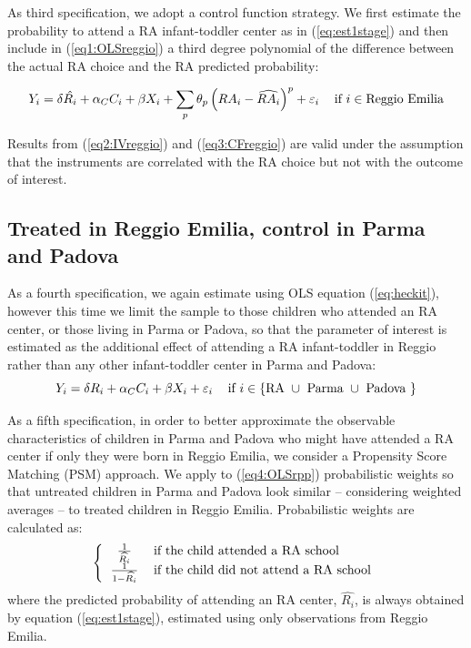 \documentclass[12pt]{article}
\begin{document}
\medskip

As third specification, we adopt a control function strategy. We first estimate the probability to attend a RA infant-toddler center as in (\ref{eq:est1stage}) and then include in (\ref{eq1:OLSreggio}) a third degree polynomial of the difference between the actual RA choice and the RA predicted probability:%

\begin{equation}
Y_{i} = \delta \hat{R_{i}} + \alpha_{C} C_{i} + \beta X_{i} + \sum_p \theta_{p} \left(RA_{i} - \widehat{RA_{i}} \right)^{p} + \varepsilon_{i} \hspace{2ex} \text{ if } i \in \text{Reggio Emilia} \label{eq3:CFreggio}
\end{equation}

Results from (\ref{eq2:IVreggio}) and (\ref{eq3:CFreggio}) are valid under the assumption that the instruments are correlated with the RA choice but not with the outcome of interest.

\subsection{Treated in Reggio Emilia, control in Parma and Padova}

As a fourth specification, we again estimate using OLS equation (\ref{eq:heckit}), however this time we limit the sample to those children who attended an RA center, or those living in Parma or Padova, so that the parameter of interest is estimated as the additional effect of attending a RA infant-toddler in Reggio rather than any other infant-toddler center in Parma and Padova:
%
\begin{equation}
Y_{i} = \delta R_{i} + \alpha_{C} C_{i} + \beta X_{i} + \varepsilon_{i}    \hspace{2ex} \text{ if } i \in \{\text{RA } \cup \text{ Parma } \cup \text{ Padova } \} \label{eq4:OLSrpp}
\end{equation} 

\medskip

As a fifth specification, in order to better approximate the observable characteristics of children in Parma and Padova who might have attended a RA center if only they were born in Reggio Emilia, we consider a Propensity Score Matching (PSM) approach. 
We apply to (\ref{eq4:OLSrpp}) probabilistic weights so that untreated children in Parma and Padova look similar -- considering weighted averages -- to treated children in Reggio Emilia. 
Probabilistic weights are calculated as:%
\begin{equation}
\left\{
\begin{tabular}{cl}
$\frac{1}{\widehat{R_{i}}}$   & if the child attended a RA school \\
$\frac{1}{1-\widehat{R_{i}}}$ & if the child did not attend a RA school
\end{tabular}
\right. \label{eq:weights}
\end{equation}
%
where the predicted probability of attending an RA center, $\widehat{R_{i}}$, is always obtained by equation (\ref{eq:est1stage}), estimated using only observations from Reggio Emilia.
\end{document}
